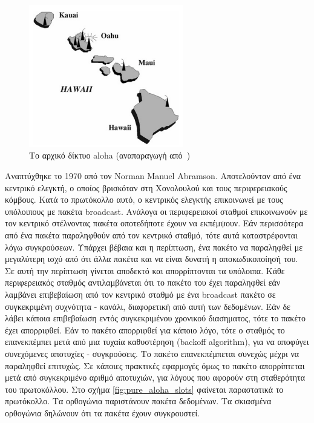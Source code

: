 \documentclass[12pt]{report}
\begin{document}
\begin{figure}[ht]
\centering
\includegraphics[width=0.6\textwidth]{hawaii}
\caption{Το αρχικό δίκτυο \textlatin{aloha} (αναπαραγωγή από~\cite{book:01})}
\label{fig:hawaii}
\end{figure}

Αναπτύχθηκε το 1970 από τον \textlatin{Norman Manuel Abramson}. Αποτελούνταν από ένα κεντρικό ελεγκτή, ο οποίος βρισκόταν στη Χονολουλού και τους περιφερειακούς κόμβους. Κατά το πρωτόκολλο αυτό, ο κεντρικός ελεγκτής επικοινωνεί με τους υπόλοιπους με πακέτα \textlatin{broadcast}. Ανάλογα οι περιφερειακοί σταθμοί επικοινωνούν με τον κεντρικό στέλνοντας πακέτα οποτεδήποτε έχουν να εκπέμψουν. Εάν περισσότερα από ένα πακέτα παραληφθούν από τον κεντρικό σταθμό, τότε αυτά καταστρέφονται λόγω συγκρούσεων. Υπάρχει βέβαια και η περίπτωση, ένα πακέτο να παραληφθεί με μεγαλύτερη ισχύ από ότι άλλα πακέτα και να είναι δυνατή η αποκωδικοποίησή του. Σε αυτή την περίπτωση γίνεται αποδεκτό και απορρίπτονται τα υπόλοιπα. Κάθε περιφερειακός σταθμός αντιλαμβάνεται ότι το πακέτο του έχει παραληφθεί εάν λαμβάνει επιβεβαίωση από τον κεντρικό σταθμό με ένα \textlatin{broadcast} πακέτο σε συγκεκριμένη συχνότητα - κανάλι, διαφορετική από αυτή των δεδομένων. Εάν δε λάβει κάποια επιβεβαίωση εντός συγκεκριμένου χρονικού διασηματος, τότε το πακέτο έχει απορριφθεί. Εάν το πακέτο απορριφθεί για κάποιο λόγο, τότε ο σταθμός το επανεκπέμπει μετά από μια τυχαία καθυστέρηση (\textlatin{backoff algorithm}), για να αποφύγει συνεχόμενες αποτυχίες - συγκρούσεις. Το πακέτο επανεκπέμπεται συνεχώς μέχρι να παραληφθεί επιτυχώς. Σε κάποιες πρακτικές εφαρμογές όμως το πακέτο απορρίπτεται μετά από συγκεκριμένο αριθμό αποτυχιών, για λόγους που αφορούν στη σταθερότητα του πρωτοκόλλου. Στο σχήμα \ref{fig:pure_aloha_slots} φαίνεται παραστατικά το πρωτόκολλο. Τα ορθογώνια παριστάνουν πακέτα δεδομένων. Τα σκιασμένα ορθογώνια δηλώνουν ότι τα πακέτα έχουν συγκρουστεί.
\end{document}
